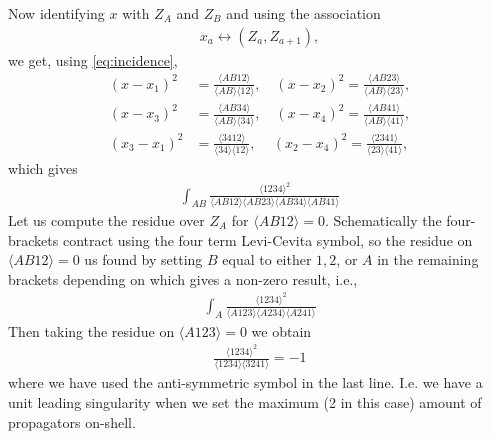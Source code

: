 \documentclass[letter,12pt]{article}
\newcommand{\la}{\langle}
\newcommand{\ra}{\rangle}
\begin{document}
Now identifying $x$ with $Z_A$ and $Z_B$ and using the association
\begin{equation}
	\begin{aligned}
		x_a\leftrightarrow (Z_a,Z_{a+1}),
	\end{aligned}
\end{equation}
we get, using \eqref{eq:incidence},
\begin{equation}
	\begin{aligned}
		(x-x_1)^2 & = \frac{\la A B 1 2\ra}{\la A B\ra \la 1 2\ra },\quad
		(x-x_2)^2 = \frac{\la A B 2 3\ra}{\la A B\ra \la 2 3\ra },\\
		(x-x_3)^2 & = \frac{\la A B 3 4\ra}{\la A B\ra \la 3 4\ra }, \quad
		(x-x_4)^2 = \frac{\la A B 4 1\ra}{\la A B\ra \la 4 1\ra },\\
		(x_3-x_1)^2 & = \frac{\la 3 4 1 2\ra}{\la 34\ra \la  1 2\ra }, \quad \,	(x_2-x_4)^2 = \frac{\la 2 3 4 1\ra}{\la 23\ra \la  4 1\ra }, 
	\end{aligned}
\end{equation}
which gives
\begin{equation}
	\begin{aligned}
		\int_{A B} \frac{\la 1234 \ra^2}{
			\la A B 1 2\ra
			\la A B 2 3\ra
			\la A B 3 4\ra
			\la A B 4 1\ra}
	\end{aligned}
\end{equation}
Let us compute the residue over $Z_A$ for $\la AB 12 \ra =0$. Schematically the four-brackets contract using the four term Levi-Cevita symbol, so the residue on $\la AB 12 \ra =0$ us found by setting $B$ equal to either $1,2$, or $A$ in the remaining brackets depending on which gives a non-zero result, i.e.,
\begin{equation}
	\begin{aligned}
		\int_{A} \frac{\la 1234 \ra^2}{
			\la A 1 2 3\ra
			\la A 2 3 4\ra
			\la A 2 4 1\ra}
	\end{aligned}
\end{equation}
Then taking the residue on $\la A 1 2 3\ra=0$ we obtain
\begin{equation}
	\begin{aligned}
	 \frac{\la 1234 \ra^2}{
			\la 1 2 3 4\ra
			\la 3 2 4 1\ra}=-1
	\end{aligned}
\end{equation}
where we have used the anti-symmetric symbol in the last line. I.e. we have a unit leading singularity when we set the maximum (2 in this case) amount of propagators on-shell.
\end{document}
